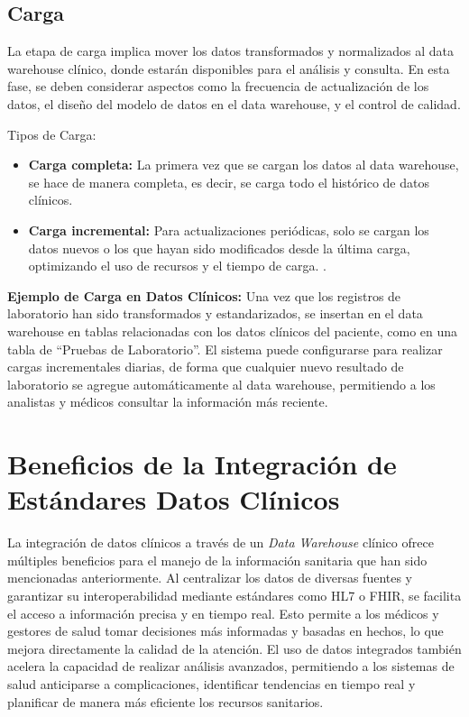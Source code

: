 \documentclass[12pt, a4paper, twoside]{article}
\begin{document}
	
	\subsection{Carga}
	
	La etapa de carga implica mover los datos transformados y normalizados al data warehouse clínico, donde estarán disponibles para el análisis y consulta. En esta fase, se deben considerar aspectos como la frecuencia de actualización de los datos, el diseño del modelo de datos en el data warehouse, y el control de calidad.
	
	Tipos de Carga:
	\begin{itemize}
		\item \textbf{Carga completa:} La primera vez que se cargan los datos al data warehouse, se hace de manera completa, es decir, se carga todo el histórico de datos clínicos\cite{ESIC_DataWarehouse}.
		
		\item \textbf{Carga incremental:} Para actualizaciones periódicas, solo se cargan los datos nuevos o los que hayan sido modificados desde la última carga, optimizando el uso de recursos y el tiempo de carga. \cite{ESIC_DataWarehouse}.
	\end{itemize}
	
	\textbf{Ejemplo de Carga en Datos Clínicos:} Una vez que los registros de laboratorio han sido transformados y estandarizados, se insertan en el data warehouse en tablas relacionadas con los datos clínicos del paciente, como en una tabla de “Pruebas de Laboratorio”. El sistema puede configurarse para realizar cargas incrementales diarias, de forma que cualquier nuevo resultado de laboratorio se agregue automáticamente al data warehouse, permitiendo a los analistas y médicos consultar la información más reciente.
	
	
	\section{Beneficios de la Integración de Estándares  Datos Clínicos}
	
	La integración de datos clínicos a través de un \textit{Data Warehouse} clínico ofrece múltiples beneficios para el manejo de la información sanitaria que han sido mencionadas anteriormente. Al centralizar los datos de diversas fuentes y garantizar su interoperabilidad mediante estándares como HL7 o FHIR, se facilita el acceso a información precisa y en tiempo real. Esto permite a los médicos y gestores de salud tomar decisiones más informadas y basadas en hechos, lo que mejora directamente la calidad de la atención. El uso de datos integrados también acelera la capacidad de realizar análisis avanzados, permitiendo a los sistemas de salud anticiparse a complicaciones, identificar tendencias en tiempo real y planificar de manera más eficiente los recursos sanitarios.
	
\end{document}
